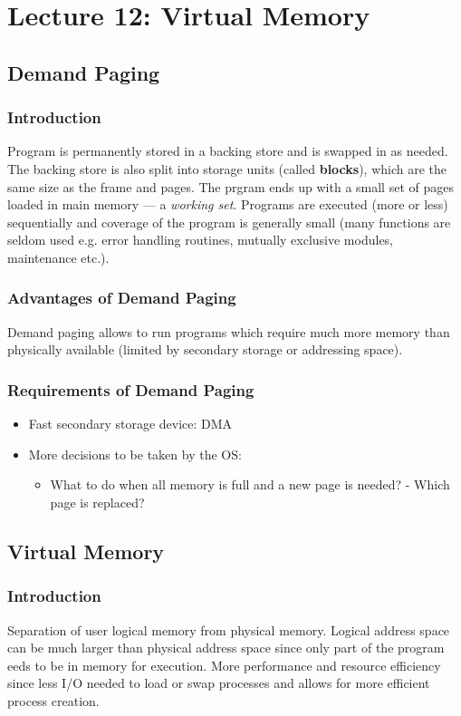 \documentclass{article}%
\begin{document}
\section{Lecture 12: Virtual Memory}


\subsection{Demand Paging}
\label{sec:orge98cd7e}
\subsubsection{Introduction}
\label{sec:orgd11b047}
Program is permanently stored in a backing store and is swapped in as needed.
The backing store is also split into storage units (called \textbf{blocks}), which are the same size as the frame and pages.
The prgram ends up with a small set of pages loaded in main memory --- a \emph{working set}.
Programs are executed (more or less) sequentially and coverage of the program is generally small (many functions are seldom used e.g. error handling routines, mutually exclusive modules, maintenance etc.).
\subsubsection{Advantages of Demand Paging}
\label{sec:orgf47bba3}
Demand paging allows to run programs which require much more memory than physically available (limited by secondary storage or addressing space).

\subsubsection{Requirements of Demand Paging}
\label{sec:orge156f17}
\begin{itemize}
\item Fast secondary storage device: DMA
\item More decisions to be taken by the OS:
\begin{itemize}
\item What to do when all memory is full and a new page is needed? - Which page is replaced?
\end{itemize}
\end{itemize}
\subsection{Virtual Memory}
\label{sec:orgf5b4dae}
\subsubsection{Introduction}
\label{sec:orgd127f1a}
Separation of user logical memory from physical memory.
Logical address space can be much larger than physical address space since only part of the program eeds to be in memory for execution.
More performance and resource efficiency since less I/O needed to load or swap processes and allows for more efficient process creation.
\end{document}
